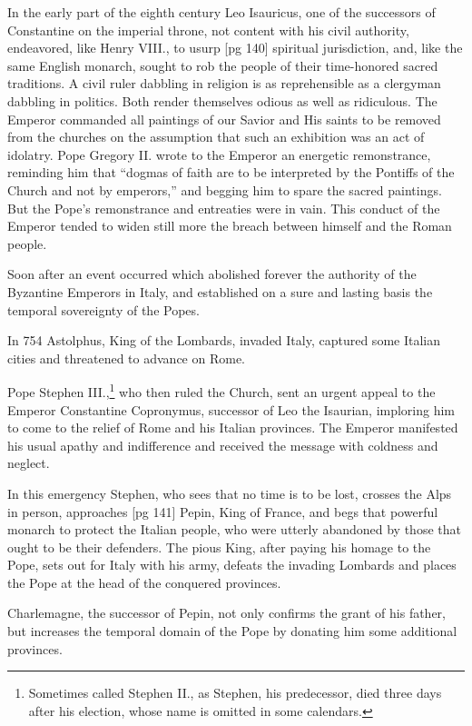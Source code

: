 In the early part of the eighth century Leo
Isauricus, one of the successors of Constantine on
the imperial throne, not content with his civil authority,
endeavored, like Henry VIII., to usurp
[pg 140]
spiritual jurisdiction, and, like the same English
monarch, sought to rob the people of their time-honored
sacred traditions. A civil ruler dabbling
in religion is as reprehensible as a clergyman dabbling
in politics. Both render themselves odious
as well as ridiculous. The Emperor commanded
all paintings of our Savior and His saints to be removed
from the churches on the assumption that
such an exhibition was an act of idolatry. Pope
Gregory II. wrote to the Emperor an energetic
remonstrance, reminding him that “dogmas of
faith are to be interpreted by the Pontiffs of the
Church and not by emperors,” and begging him
to spare the sacred paintings. But the Pope's
remonstrance and entreaties were in vain. This
conduct of the Emperor tended to widen still more
the breach between himself and the Roman people.

Soon after an event occurred which abolished
forever the authority of the Byzantine Emperors
in Italy, and established on a sure and lasting
basis the temporal sovereignty of the Popes.

In 754 Astolphus, King of the Lombards, invaded
Italy, captured some Italian cities and
threatened to advance on Rome.

Pope Stephen III.,\footnote{Sometimes
called Stephen II., as Stephen, his predecessor,
died three days after his election, whose name is omitted in
some calendars.} who then ruled the Church,
sent an urgent appeal to the Emperor Constantine
Copronymus, successor of Leo the Isaurian, imploring
him to come to the relief of Rome and his
Italian provinces. The Emperor manifested his
usual apathy and indifference and received the
message with coldness and neglect.

In this emergency Stephen, who sees that no
time is to be lost, crosses the Alps in person, approaches
[pg 141]
Pepin, King of France, and begs that
powerful monarch to protect the Italian people,
who were utterly abandoned by those that ought
to be their defenders. The pious King, after paying
his homage to the Pope, sets out for Italy with
his army, defeats the invading Lombards and
places the Pope at the head of the conquered
provinces.

Charlemagne, the successor of Pepin, not only
confirms the grant of his father, but increases the
temporal domain of the Pope by donating him
some additional provinces.

